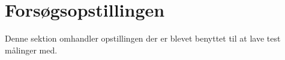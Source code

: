 \section{Forsøgsopstillingen}
Denne sektion omhandler opstillingen der er blevet benyttet til at lave test målinger med.

